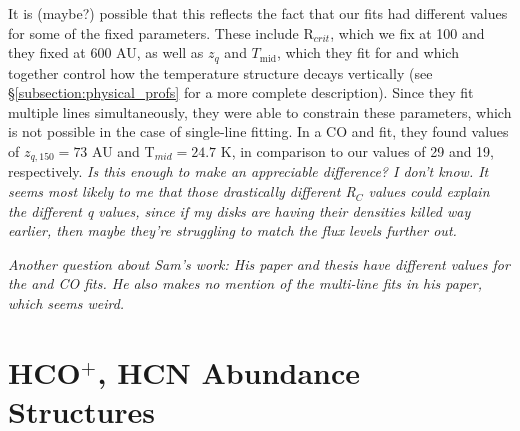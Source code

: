 It is (maybe?) possible that this reflects the fact that our fits had different values for some of the fixed parameters. These include R$_{crit}$, which we fix at 100 and they fixed at 600 AU, as well as $z_q$ and $T_\text{mid}$, which they fit for and which together control how the temperature structure decays vertically (see \S\ref{subsection:physical_profs} for a more complete description). Since they fit multiple lines simultaneously, they were able to constrain these parameters, which is not possible in the case of single-line fitting. In a CO and \hco fit, they found values of $z_{q, 150} = 73$ AU and T$_{mid} = 24.7$ K, in comparison to our values of 29 and 19, respectively. \textit{Is this enough to make an appreciable difference? I don't know. It seems most likely to me that those drastically different R$_C$ values could explain the different q values, since if my disks are having their densities killed way earlier, then maybe they're struggling to match the flux levels further out. }

\textit{Another question about Sam's work: His paper and thesis have different values for the \hco and CO fits. He also makes no mention of the multi-line fits in his paper, which seems weird.}








\section{HCO$^+$, HCN Abundance Structures}
\label{section:fitting_procedure}










